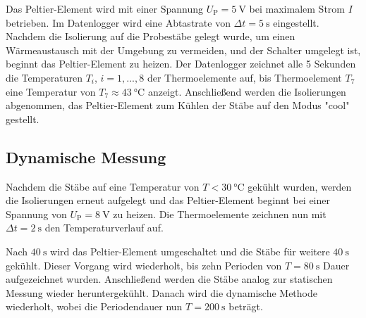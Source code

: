 Das Peltier-Element wird mit einer Spannung $U_\mathup{P}= \SI{5}{\volt}$ bei maximalem Strom $I$ betrieben. 
Im Datenlogger wird eine Abtastrate von $\Delta{t}=\SI{5}{\second}$ eingestellt. 
Nachdem die Isolierung auf die Probestäbe gelegt wurde, um einen Wärmeaustausch mit der Umgebung zu vermeiden, und der Schalter umgelegt ist, beginnt das Peltier-Element zu heizen. 
Der Datenlogger zeichnet alle 5 Sekunden die Temperaturen $T_i$, $i=1, ... ,8$ der Thermoelemente auf, bis Thermoelement $T_7$ eine Temperatur von $T_\mathup{7}\approx \SI{43}{\degreeCelsius}$ anzeigt. 
Anschließend werden die Isolierungen abgenommen, das Peltier-Element zum Kühlen der Stäbe auf den Modus "cool" gestellt.

\subsection{Dynamische Messung}
Nachdem die Stäbe auf eine Temperatur von $T<\SI{30}{\degreeCelsius}$ gekühlt wurden, werden die Isolierungen erneut aufgelegt und das Peltier-Element beginnt bei einer Spannung von $U_\mathup{P}=\SI{8}{\volt}$ zu heizen. Die Thermoelemente zeichnen nun mit $\Delta{t}=\SI{2}{\second}$ den Temperaturverlauf auf.

Nach $\SI{40}{\second}$ wird das Peltier-Element umgeschaltet und die Stäbe für weitere $\SI{40}{\second}$ gekühlt. 
Dieser Vorgang wird wiederholt, bis zehn Perioden von $T=\SI{80}{\second}$ Dauer aufgezeichnet wurden. 
Anschließend werden die Stäbe analog zur statischen Messung wieder heruntergekühlt. 
Danach wird die dynamische Methode wiederholt, wobei die Periodendauer nun $T=\SI{200}{\second}$ beträgt. 

